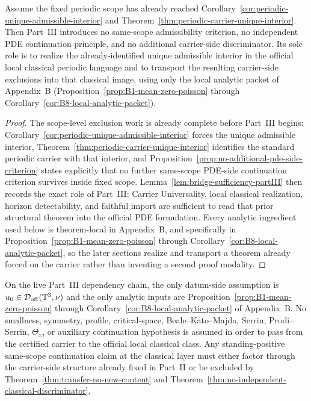 \begin{manualproposition}
\label{prop:partIII-transport-only}
Assume the fixed periodic scope has already reached Corollary~\ref{cor:periodic-unique-admissible-interior} and Theorem~\ref{thm:periodic-carrier-unique-interior}. Then Part~III introduces no same-scope admissibility criterion, no independent PDE continuation principle, and no additional carrier-side discriminator. Its sole role is to realize the already-identified unique admissible interior in the official local classical periodic language and to transport the resulting carrier-side exclusions into that classical image, using only the local analytic packet of Appendix~B (Proposition~\ref{prop:B1-mean-zero-poisson} through Corollary~\ref{cor:B8-local-analytic-packet}).
\end{manualproposition}

\begin{proof}
The scope-level exclusion work is already complete before Part~III begins: Corollary~\ref{cor:periodic-unique-admissible-interior} forces the unique admissible interior, Theorem~\ref{thm:periodic-carrier-unique-interior} identifies the standard periodic carrier with that interior, and Proposition~\ref{prop:no-additional-pde-side-criterion} states explicitly that no further same-scope PDE-side continuation criterion survives inside fixed scope. Lemma~\ref{lem:bridge-sufficiency-partIII} then records the exact role of Part~III: Carrier Universality, local classical realization, horizon detectability, and faithful import are sufficient to read that prior structural theorem into the official PDE formulation. Every analytic ingredient used below is theorem-local in Appendix~B, and specifically in Proposition~\ref{prop:B1-mean-zero-poisson} through Corollary~\ref{cor:B8-local-analytic-packet}, so the later sections realize and transport a theorem already forced on the carrier rather than inventing a second proof modality.
\end{proof}

\begin{manualproposition}
\label{prop:no-hidden-transfer-hypothesis}
On the live Part~III dependency chain, the only datum-side assumption is $u_0\in\mathcal D_{\mathrm{off}}(\mathbb{T}^3,\nu)$ and the only analytic inputs are Proposition~\ref{prop:B1-mean-zero-poisson} through Corollary~\ref{cor:B8-local-analytic-packet} of Appendix~B. No smallness, symmetry, profile, critical-space, Beale--Kato--Majda, Serrin, Prodi--Serrin, $\Theta_x$, or auxiliary continuation hypothesis is assumed in order to pass from the certified carrier to the official local classical class. Any standing-positive same-scope continuation claim at the classical layer must either factor through the carrier-side structure already fixed in Part~II or be excluded by Theorem~\ref{thm:transfer-no-new-content} and Theorem~\ref{thm:no-independent-classical-discriminator}.
\end{manualproposition}

